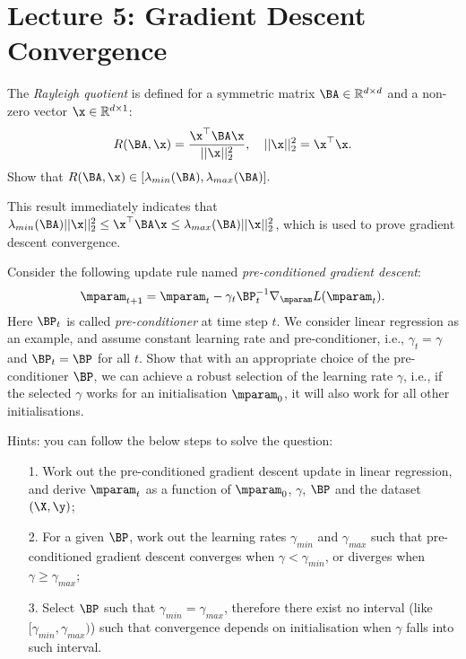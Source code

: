 \section{Lecture 5: Gradient Descent Convergence}

\begin{question}
\label{q:rayleigh_quotient}
The \emph{Rayleigh quotient} is defined for a symmetric matrix $\BA \in \mathbb{R}^{d \times d}$ and a non-zero vector $\x \in \mathbb{R}^{d \times 1}$:
\begin{equation*}
R(\BA, \x) = \frac{\x^\top \BA \x}{|| \x ||_2^2}, \quad || \x ||_2^2 = \x^\top \x.
\end{equation*}
Show that
$R(\BA, \x) \in [\lambda_{min}(\BA), \lambda_{max}(\BA)].$

This result immediately indicates that $\lambda_{min}(\BA) || \x ||_2^2 \leq \x^\top \BA \x \leq \lambda_{max}(\BA) || \x ||_2^2$, which is used to prove gradient descent convergence.
\end{question}


\begin{question}
\label{q:pre_conditioned_gd}
Consider the following update rule named \emph{pre-conditioned gradient descent}:
$$\mparam_{t+1} = \mparam_t - \gamma_t \BP_t^{-1} \nabla_{\mparam} L(\mparam_t).$$
Here $\BP_t$ is called \emph{pre-conditioner} at time step $t$. We consider linear regression as an example, and assume constant learning rate and pre-conditioner, i.e., $\gamma_t = \gamma$ and $\BP_t = \BP$ for all $t$. 
%
Show that with an appropriate choice of the pre-conditioner $\BP$, we can achieve a robust selection of the learning rate $\gamma$, i.e., if the selected $\gamma$ works for an initialisation $\mparam_0$, it will also work for all other initialisations.

Hints: you can follow the below steps to solve the question:
\begin{itemize}
    \item[1.] Work out the pre-conditioned gradient descent update in linear regression, and derive $\mparam_t$ as a function of $\mparam_0$, $\gamma$, $\BP$ and the dataset $(\X, \y)$;
    \item[2.] For a given $\BP$, work out the learning rates $\gamma_{min}$ and $\gamma_{max}$ such that pre-conditioned gradient descent converges when $\gamma < \gamma_{min}$, or diverges when $\gamma \geq \gamma_{max}$;
    \item[3.] Select $\BP$ such that $\gamma_{min} = \gamma_{max}$, therefore there exist no interval (like $[\gamma_{min}, \gamma_{max})$) such that convergence depends on initialisation when $\gamma$ falls into such interval.
\end{itemize}
\end{question}


